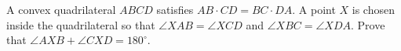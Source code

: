 A convex quadrilateral $ABCD$ satisfies $AB \cdot CD = BC \cdot DA$.
A point $X$ is chosen inside the quadrilateral so that $\angle XAB = \angle XCD$ and $\angle XBC = \angle XDA$.
Prove that $\angle AXB + \angle CXD = 180^\circ$.
